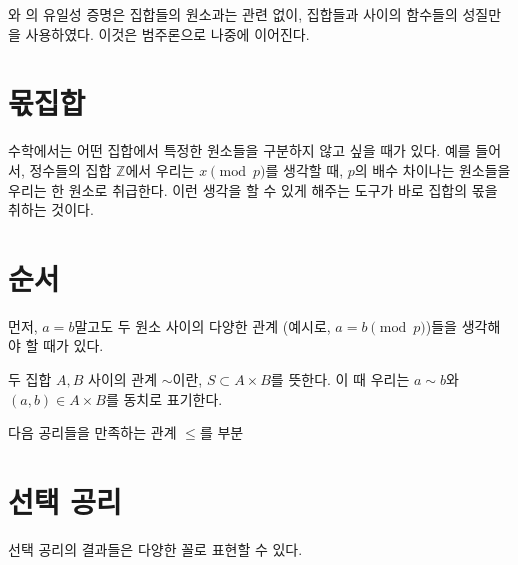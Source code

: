 와 의 유일성 증명은 집합들의 원소과는 관련 없이, 집합들과 사이의 함수들의 성질만을 사용하였다.
이것은 범주론으로 나중에 이어진다.

\section{몫집합}
수학에서는 어떤 집합에서 특정한 원소들을 구분하지 않고 싶을 때가 있다.
예를 들어서, 정수들의 집합 $\mathbb{Z}$에서 우리는 $x \pmod{p}$를 생각할 때, $p$의 배수 차이나는 원소들을 우리는 한 원소로 취급한다.
이런 생각을 할 수 있게 해주는 도구가 바로 집합의 몫을 취하는 것이다.

\section{순서}
먼저, $a = b$말고도 두 원소 사이의 다양한 관계 (예시로, $a = b \pmod{p}$)들을 생각해야 할 때가 있다.
\begin{definition}
\label{def:relation}
    두 집합 $A, B$ 사이의 관계 $\sim$이란, $S \subset A \times B$를 뜻한다.
    이 때 우리는 $a \sim b$와 $(a, b) \in A \times B$를 동치로 표기한다.  
\end{definition}

\begin{definition}
    다음 공리들을 만족하는 관계 $\leq$를 부분 
\end{definition}

\section{선택 공리}
선택 공리의 결과들은 다양한 꼴로 표현할 수 있다.


